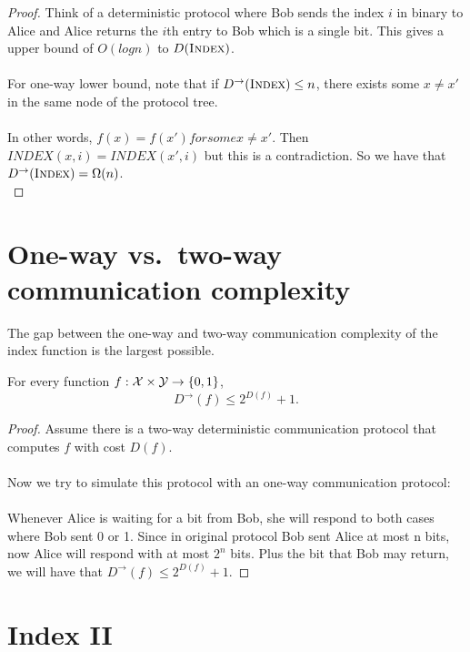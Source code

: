 \begin{proof}
	Think of a deterministic protocol where Bob sends the index $i$ in binary to Alice and Alice returns the $i$th entry to Bob which is a single bit. This gives a upper bound of $O(logn)$ to $D(\textsc{Index})$.\\
	\\
	For one-way lower bound, note that if $D^\rightarrow(\textsc{Index}) \leq n$, there exists some $x \neq x'$ in the same node of the protocol tree. \\
	\\
	In other words, $f(x)=f(x') for some x\neq x'$. Then $INDEX(x,i)=INDEX(x',i)$ but this is a contradiction. So we have that $D^\rightarrow(\textsc{Index}) = \Omega(n)$.\\
\end{proof}




\section{One-way vs.~two-way communication complexity}

The gap between the one-way and two-way communication complexity of the index function is the largest possible.

\begin{theorem}
	For every function $f : \mathcal{X} \times \mathcal{Y} \to \{0,1\}$,
	\[
	D^\rightarrow(f) \le 2^{D(f)}+1.
	\]
\end{theorem}

\begin{proof}
	Assume there is a two-way deterministic communication protocol that computes $f$ with cost $D(f)$. \\
	\\
	Now we try to simulate this protocol with an one-way communication protocol: \\
	\\
	Whenever Alice is waiting for a bit from Bob, she will respond to both cases where Bob sent 0 or 1. Since in original protocol Bob sent Alice at most n bits, now Alice will respond with at most $2^n$ bits. Plus the bit that Bob may return, we will have that $D^\rightarrow(f) \le 2^{D(f)}+1$.
\end{proof}




\section{Index II}

